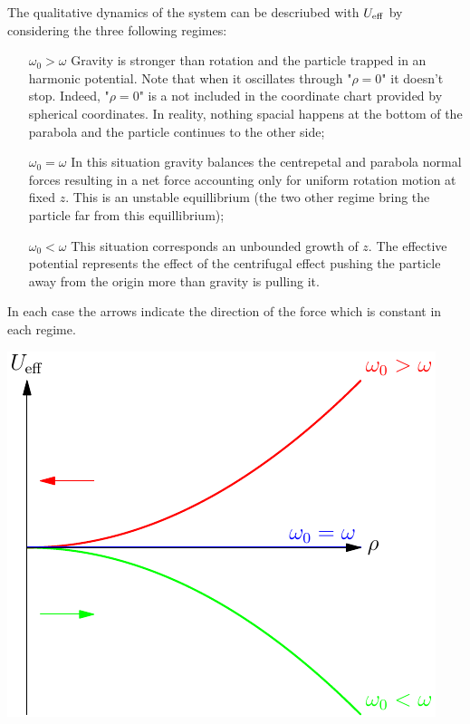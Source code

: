 \documentclass[12pt, a4paper]{article}
\begin{document}
The qualitative dynamics of the system can be descriubed with $U_{\rm eff}$ by considering the three following regimes:\\[0.5cm]
\begin{minipage}{0.5\textwidth}
    \begin{enumerate}
        \item[$\omega_0 > \omega$] Gravity is stronger than rotation and the particle trapped in an harmonic potential. Note that when it oscillates through "$\rho=0$" it doesn't stop. Indeed, "$\rho=0$" is a not included in the coordinate chart provided by spherical coordinates. In reality, nothing spacial happens at the bottom of the parabola and the particle continues to the other side;
        \item[$\omega_0 = \omega$] In this situation gravity balances the centrepetal and parabola normal forces resulting in a net force accounting only for uniform rotation motion at fixed $z$. This is an unstable equillibrium (the two other regime bring the particle far from this equillibrium);
        \item[$\omega_0 < \omega$] This situation corresponds an unbounded growth of $z$. The effective potential represents the effect of the centrifugal effect pushing the particle away from the origin more than gravity is pulling it. 
    \end{enumerate}
    In each case the arrows indicate the direction of the force which is constant in each regime. 
\end{minipage}
\hfill
\begin{minipage}{0.4\textwidth}
    \includegraphics[width=\linewidth]{figures/Ueff.pdf}
\end{minipage}
\end{document}
